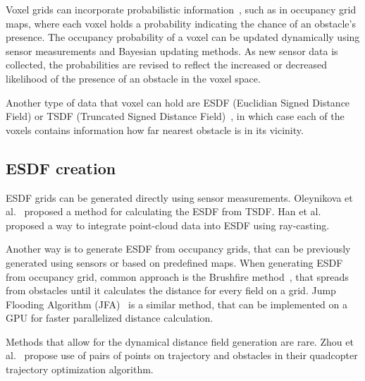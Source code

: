 \documentclass[]{article}
\begin{document}
Voxel grids can incorporate probabilistic information~\cite{thrun2002probabilistic, dryanovski2010multivolume}, such as in occupancy grid maps, where each voxel holds a probability indicating the chance of an obstacle's presence. The occupancy probability of a voxel can be updated dynamically using sensor measurements and Bayesian updating methods. As new sensor data is collected, the probabilities are revised to reflect the increased or decreased likelihood of the presence of an obstacle in the voxel space. 

Another type of data that voxel  can hold are ESDF (Euclidian Signed Distance Field) or TSDF (Truncated Signed Distance Field)~\cite{oleynikova2017voxblox}, in which case each of the voxels contains information how far nearest obstacle is in its vicinity.

\subsection{ESDF creation}

ESDF grids can be generated directly using sensor measurements. Oleynikova et al.~\cite{oleynikova2017voxblox} proposed a method for calculating the ESDF from TSDF. Han et al.~\cite{han2019fiesta} proposed a way to integrate point-cloud data into ESDF using ray-casting.  

Another way is to generate ESDF from occupancy grids, that can be previously generated using sensors or based on predefined maps. When generating ESDF from occupancy grid, common approach is the Brushfire method~\cite{lau2010improved}, that spreads from obstacles until it calculates the distance for every field on a grid. Jump Flooding Algorithm (JFA)~\cite{rong2006jump} is a similar method, that can be implemented on a GPU for faster parallelized distance calculation.  

Methods that allow for the dynamical distance field generation are rare. Zhou et al.~\cite{zhou2021egoplanner} propose use of pairs of points on trajectory and obstacles in their quadcopter trajectory optimization algorithm.

\end{document}
